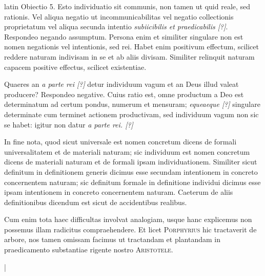 \begin{otherlanguage*}{latin}
\pstart
Obiectio 5. Esto individuatio sit communis, non tamen ut quid reale, sed rationis. Vel aliqua negatio ut incommunicabilitas vel negatio collectionis proprietatum vel aliqua secunda intentio \emph{subiicibilis et praedicabilis [?]}. Respondeo negando assumptum. Persona enim et similiter singulare non est nomen negationis vel intentionis, sed rei. Habet enim positivum effectum, scilicet reddere naturam indivisam in se et ab aliis divisam. Similiter relinquit naturam capacem positive effectus, scilicet existentiae. 
\pend

\pstart
Quaeres an \emph{a parte rei [?]} detur individuum vagum et an Deus illud valeat producere? Respondeo negative. Cuius ratio est, omne productum a Deo est determinatum ad certum pondus, numerum et mensuram; \emph{equeaeque [?]} singulare determinate cum terminet actionem productivam, sed individuum vagum non sic se habet:
igitur non datur \emph{a parte rei. [?]} 
\pend

\pstart
In fine nota, quod sicut universale est nomen concretum dicens de formali universalitatem et de materiali naturam; sic individuum est nomen concretum dicens de materiali naturam et de formali ipsam individuationem. Similiter sicut definitum in definitionem generis dicimus esse secundam intentionem in concreto concernentem naturam; sic definitum formale in definitione individui dicimus esse ipsam intentionem in concreto concernentem naturam. Caeterum de aliis definitionibus dicendum est sicut de accidentibus realibus. 
\pend

\pstart
Cum enim tota haec difficultas involvat analogiam, usque hanc explicemus non possemus illam radicitus compraehendere. Et licet \textsc{Porphyrius} hic tractaverit de arbore, nos tamen omissam facimus ut tractandam et plantandam in praedicamento substantiae rigente nostro \textsc{Aristotele}. 
\pend

\pstart
{}
\pend

\pstart
{}
\pend

\pstart
\textnormal{|}  
\pend


\end{otherlanguage*}
